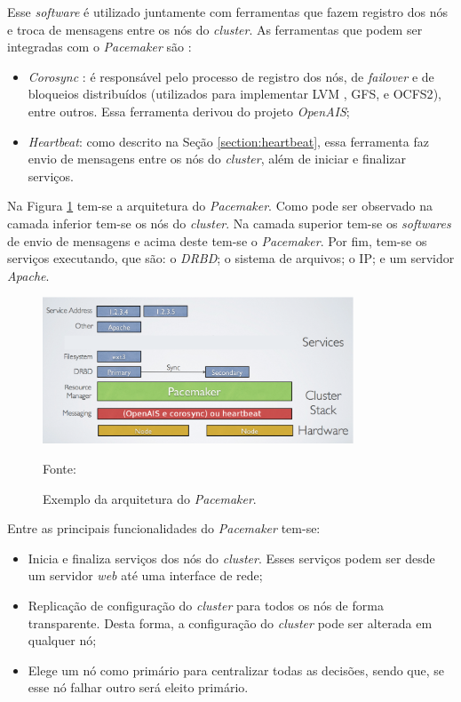 Esse \textit{software} é utilizado juntamente com ferramentas que fazem registro dos nós e troca de mensagens entre os nós do \textit{cluster}.
As ferramentas que podem ser integradas com o \textit{Pacemaker} são \cite{pacemaker}:
\begin{itemize}
 \item \textit{Corosync} \cite{corosync}: é responsável pelo processo de registro dos nós, de \textit{failover} e de bloqueios distribuídos 
 (utilizados para implementar \ac{LVM} \cite{lvm}, \ac{GFS}, e \ac{OCFS2}), entre outros. Essa ferramenta derivou do projeto \textit{OpenAIS};
 \item \textit{Heartbeat}: como descrito na Seção \ref{section:heartbeat}, essa ferramenta faz envio de mensagens entre os nós do \textit{cluster},
 além de iniciar e finalizar serviços.
\end{itemize}


Na Figura \ref{fig:pacemaker_tools} tem-se a arquitetura do \textit{Pacemaker}. Como pode ser observado na camada inferior tem-se os nós do 
\textit{cluster}. Na camada superior tem-se os \textit{softwares} de envio de mensagens e acima deste tem-se o \textit{Pacemaker}. 
Por fim, tem-se os serviços executando, que são: o \textit{DRBD}; o sistema de arquivos; o \ac{IP}; e um servidor \textit{Apache}.

\begin{figure}[h!]
 \centering
 \includegraphics[width=350px]{img/pacemaker_tools.eps}
 \caption{Exemplo da arquitetura do \textit{Pacemaker}.}
 Fonte: \citet{pacemaker}
 \label{fig:pacemaker_tools}
\end{figure}

Entre as principais funcionalidades do \textit{Pacemaker} tem-se:
\begin{itemize}
 \item Inicia e finaliza serviços dos nós do \textit{cluster}. Esses serviços podem ser desde um servidor \textit{web} até uma interface de 
 rede;
 \item Replicação de configuração do \textit{cluster} para todos os nós de forma transparente. Desta forma, a configuração do \textit{cluster} 
 pode ser alterada em qualquer nó;
 \item Elege um nó como primário para centralizar todas as decisões, sendo que, se esse nó falhar outro será eleito primário.
\end{itemize}

